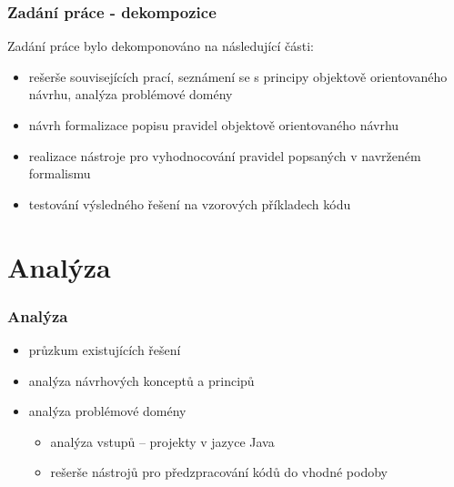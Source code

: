 \documentclass{beamer}
\begin{document}
\begin{frame}
  \frametitle{Zadání práce - dekompozice}
  Zadání práce bylo dekomponováno na následující části:
  \begin{itemize}
  \item rešerše souvisejících prací, seznámení se s principy objektově orientovaného návrhu, analýza problémové domény
  \item návrh formalizace popisu pravidel objektově orientovaného návrhu
  \item realizace nástroje pro vyhodnocování pravidel popsaných v navrženém formalismu
  \item testování výsledného řešení na vzorových příkladech kódu
  \end{itemize}
\end{frame}

\section{Analýza}
\begin{frame}
  \frametitle{Analýza}
  \begin{itemize}
  \item průzkum existujících řešení
  \item analýza návrhových konceptů a principů
  \item analýza problémové domény
    \begin{itemize}
    \item analýza vstupů -- projekty v jazyce Java
    \item rešerše nástrojů pro předzpracování kódů do vhodné podoby
    \end{itemize}
  \end{itemize}
\end{frame}
\end{document}
